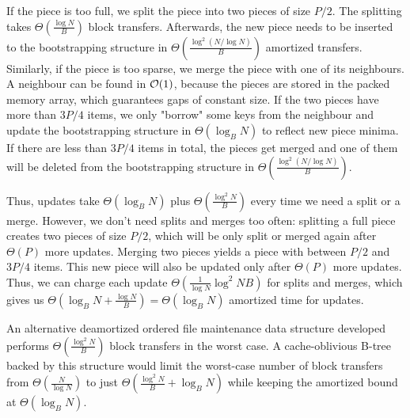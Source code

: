 If the piece is too full, we split the piece into two pieces of size
$P/2$. The splitting takes $\Theta(\frac{\log N}{B})$ block transfers.
Afterwards, the new piece needs to be inserted to the bootstrapping structure
in $\Theta(\frac{\log^2 (N/\log N)}{B})$ amortized transfers.
Similarly, if the piece is too sparse, we merge the piece with one of its
neighbours. A neighbour can be found in $\mathcal{O}(1)$, because the pieces are
stored in the packed memory array, which guarantees gaps of constant size.
If the two pieces have more than $3P/4$ items, we only "borrow" some keys from
the neighbour and update the bootstrapping structure in $\Theta(\log_B N)$
to reflect new piece minima.
If there are less than $3P/4$ items in total, the pieces get merged and one
of them will be deleted from the bootstrapping structure in
$\Theta(\frac{\log^2 (N/\log N)}{B})$.

Thus, updates take $\Theta(\log_B N)$ plus $\Theta(\frac{\log^2 N}{B})$
every time we need a split or a merge. However, we don't need splits and
merges too often: splitting a full piece creates two pieces of size $P/2$,
which will be only split or merged again after $\Theta(P)$ more updates.
Merging two pieces yields a piece with between $P/2$ and $3P/4$ items.
This new piece will also be updated only after $\Theta(P)$ more updates.
Thus, we can charge each update $\Theta(\frac{1}{\log N}{\log^2 N}{B})$
for splits and merges, which gives us $\Theta(\log_B N+\frac{\log N}{B})=
\Theta(\log_B N)$ amortized time for updates.

An alternative deamortized ordered file maintenance data structure
developed \cite{willard92} performs $\Theta(\frac{\log^2 N}{B})$
block transfers in the worst case. A cache-oblivious B-tree backed by this
structure would limit the worst-case number of block transfers from
$\Theta(\frac{N}{\log N})$ to just $\Theta(\frac{\log^2 N}{B}+\log_B N)$ while
keeping the amortized bound at $\Theta(\log_B N)$.
